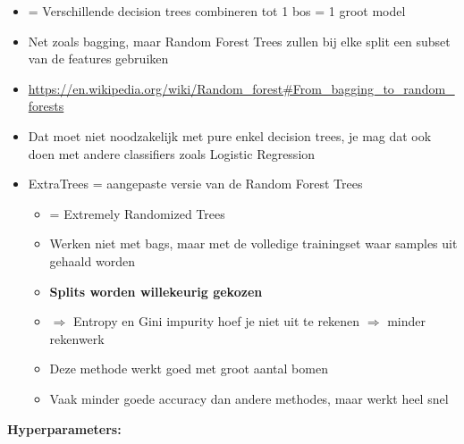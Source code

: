 \documentclass{article}
\begin{document}
\begin{itemize}
    \item = Verschillende decision trees combineren tot 1 bos = 1 groot model
    \item Net zoals bagging, maar Random Forest Trees zullen bij elke split een subset van de features gebruiken
    \item \url{https://en.wikipedia.org/wiki/Random_forest#From_bagging_to_random_forests}
    \item Dat moet niet noodzakelijk met pure enkel decision trees, je mag dat ook doen met andere classifiers zoals Logistic Regression
    \item ExtraTrees = aangepaste versie van de Random Forest Trees
    \begin{itemize}
        \item = Extremely Randomized Trees
        \item Werken niet met bags, maar met de volledige trainingset waar samples uit gehaald worden
        \item \textbf{Splits worden willekeurig gekozen}
        \item $\Rightarrow$ Entropy en Gini impurity hoef je niet uit te rekenen $\Rightarrow$ minder rekenwerk
        \item Deze methode werkt goed met groot aantal bomen
        \item Vaak minder goede accuracy dan andere methodes, maar werkt heel snel
    \end{itemize}
\end{itemize}

\textbf{Hyperparameters:}
\end{document}
